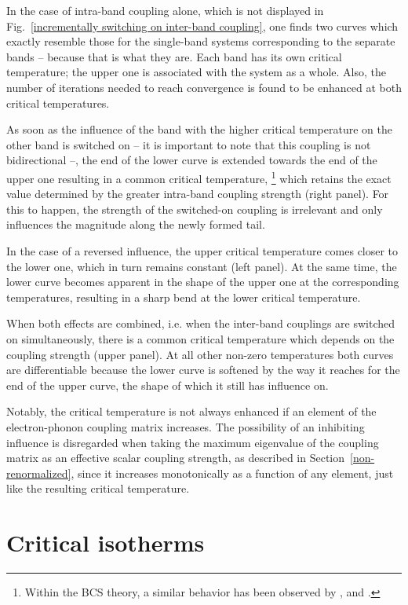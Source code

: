 In the case of intra-band coupling alone, which is not displayed in
Fig.~\ref{incrementally switching on inter-band coupling}, one finds two curves
which exactly resemble those for the single-band systems corresponding to the
separate bands -- because that is what they are. Each band has its own critical
temperature; the upper one is associated with the system as a whole. Also, the
number of iterations needed to reach convergence is found to be enhanced at both
critical temperatures.

As soon as the influence of the band with the higher critical temperature on the
other band is switched on -- it is important to note that this coupling is not
bidirectional --, the end of the lower curve is extended towards the end of the
upper one resulting in a common critical temperature,%
%
\footnote{Within the BCS theory, a similar behavior has been observed by
,  and 
\cite[Fig.~2]{SuhlMatthiasWalker59}.}
%
which retains the exact value determined by the greater intra-band coupling
strength (right panel). For this to happen, the strength of the switched-on
coupling is irrelevant and only influences the magnitude along the newly formed
tail.

In the case of a reversed influence, the upper critical temperature comes closer
to the lower one, which in turn remains constant (left panel). At the same time,
the lower curve becomes apparent in the shape of the upper one at the
corresponding temperatures, resulting in a sharp bend at the lower critical
temperature.

When both effects are combined, i.e. when the inter-band couplings are switched
on simultaneously, there is a common critical temperature which depends on the
coupling strength (upper panel). At all other non-zero temperatures both curves
are differentiable because the lower curve is softened by the way it reaches for
the end of the upper curve, the shape of which it still has influence on.

Notably, the critical temperature is not always enhanced if an element of the
electron-phonon coupling matrix increases. The possibility of an inhibiting
influence is disregarded when taking the maximum eigenvalue of the coupling
matrix as an effective scalar coupling strength, as described in
Section~\ref{non-renormalized}, since it increases monotonically as a function
of any element, just like the resulting critical temperature.

\section{Critical isotherms}

